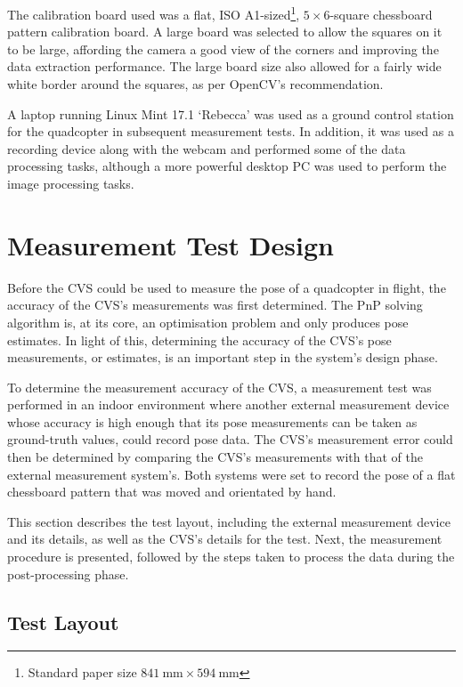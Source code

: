 The calibration board used was a flat, ISO A1-sized\footnote{Standard paper size $\SI{841}{\mm}\times\SI{594}{\mm}$}, $5\times6$-square chessboard pattern calibration board. A large board was selected to allow the squares on it to be large, affording the camera a good view of the corners and improving the data extraction performance. The large board size also allowed for a fairly wide white border around the squares, as per OpenCV's recommendation. 

A laptop running Linux Mint 17.1 `Rebecca' was used as a ground control station for the quadcopter in subsequent measurement tests. In addition, it was used as a recording device along with the webcam and performed some of the data processing tasks, although a more powerful desktop PC was used to perform the image processing tasks. 

\section{Measurement Test Design}

Before the CVS could be used to measure the pose of a quadcopter in flight, the accuracy of the CVS's measurements was first determined. The PnP solving algorithm is, at its core, an optimisation problem and only produces pose estimates. In light of this, determining the accuracy of the CVS's pose measurements, or estimates, is an important step in the system's design phase. 

To determine the measurement accuracy of the CVS, a measurement test was performed in an indoor environment where another external measurement device whose accuracy is high enough that its pose measurements can be taken as ground-truth values, could record pose data. The CVS's measurement error could then be determined by comparing the CVS's measurements with that of the external measurement system's. Both systems were set to record the pose of a flat chessboard pattern that was moved and orientated by hand.

This section describes the test layout, including the external measurement device and its details, as well as the CVS's details for the test. Next, the measurement procedure is presented, followed by the steps taken to process the data during the post-processing phase. 

\subsection{Test Layout}
\label{sec:vicon-test-setup}

